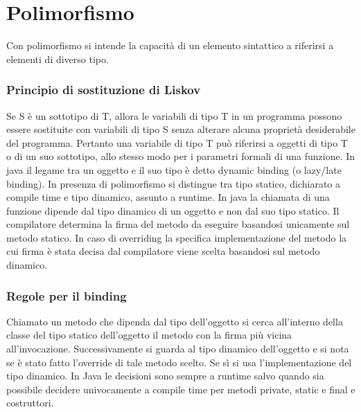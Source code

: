 \chapter{Polimorfismo}
Con polimorfismo si intende la capacit\`a di un elemento sintattico a riferirsi a elementi di diverso tipo. 
\subsection{Principio di sostituzione di Liskov}
Se S \`e un sottotipo di T, allora le variabili di tipo T in un programma possono essere sostituite con variabili di tipo S senza alterare alcuna propriet\`a desiderabile
del programma. Pertanto una variabile di tipo T pu\`o riferirsi a oggetti di tipo T o di un suo sottotipo, allo stesso modo per i parametri formali di una funzione. 
In java il legame tra un oggetto e il suo tipo \`e detto dynamic binding (o lazy/late binding). In presenza di polimorfismo si distingue tra tipo statico, dichiarato a 
compile time e tipo dinamico, assunto a runtime. In java la chiamata di una funzione dipende dal tipo dinamico di un oggetto e non dal suo tipo statico. Il compilatore
determina la firma del metodo da eseguire basandosi unicamente sul metodo statico. In caso di overriding la specifica implementazione del metodo la cui firma \`e stata 
decisa dal compilatore viene scelta basandosi sul metodo dinamico. 
\subsection{Regole per il binding}
Chiamato un metodo che dipenda dal tipo dell'oggetto si cerca all'interno della classe del tipo statico dell'oggetto il metodo con la firma pi\`u vicina all'invocazione.
Successivamente si guarda al tipo dinamico dell'oggetto e si nota se \`e stato fatto l'override di tale metodo scelto. Se s\`i si usa l'implementazione del tipo dinamico.
In Java le decisioni sono sempre a runtime salvo quando sia possibile decidere univocamente a compile time per metodi private, static e final e costruttori. 